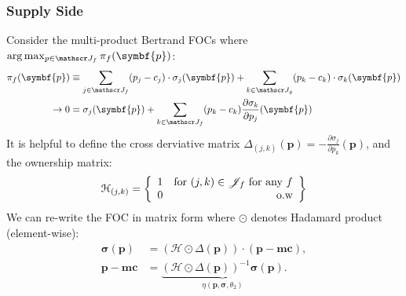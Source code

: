 \documentclass[aspectratio=169,10pt]{beamer}
\begin{document}
\begin{frame}
\frametitle{Supply Side}
\small
Consider the multi-product Bertrand FOCs where $\arg \max_{p \in \calJ_f} \pi_f (\symbf{p})$:
{\begin{align*}
\pi_f (\symbf{p}) &\equiv \sum_{j \in \calJ_f} (p_j - c_j) \cdot \sigma_j(\symbf{p}) + \sum_{k \in \calJ_g} (p_k - c_k) \cdot \sigma_k(\symbf{p}) \\
\rightarrow 0&= \sigma_j(\symbf{p}) + \sum_{k \in \calJ_f} (p_k - c_k) \frac{\partial \sigma_{k}}{\partial p_j}(\symbf{p}) 
\end{align*}
}
It is helpful to define the \alert{cross derviative matrix} $\Delta_{(j,k)}(\symbf{p})  = - \frac{\partial \sigma_{j}}{\partial p_k}(\symbf{p})$, and the \alert{ownership matrix}:
\begin{align*}
\mathcal{H}_{(j,k)} = \left\{\begin{array}{lr}
          1 & \text{for }  (j,k) \in \mathscr{J}_f \text{ for any } f \\ 
      0 & \text{o.w}\\
        \end{array} \right\}
\end{align*}
We can re-write the FOC in matrix form where $\odot$ denotes Hadamard product (element-wise):
\begin{align*}
        \symbf{\sigma}(\symbf{p}) &= (\mathcal{H} \odot \Delta(\symbf{p})) \cdot (\symbf{p} - \symbf{mc}), \\
       \symbf{p}-\symbf{mc} &=  \underbrace{(\mathcal{H} \odot \Delta(\symbf{p}))^{-1} \symbf{\sigma}(\symbf{p})}_{\eta(\symbf{p},\symbf{\sigma},\theta_2)}.
\end{align*}
\end{frame}
\end{document}
